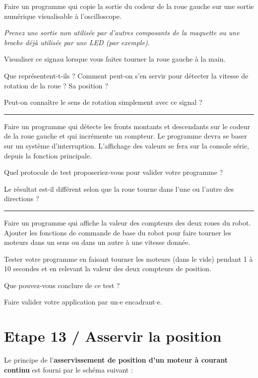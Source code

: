 \documentclass[a4paper,12pt,titlepage]{article} %
\begin{document}
\Manip Faire un programme qui copie la sortie du codeur de la roue gauche sur une sortie numérique visualisable à l'oscilloscope.

\textit{Prenez une sortie non utilisée par d'autres composants de la maquette ou une broche déjà utilisée par une LED (par exemple).}

\Manip Visualiser ce signau lorsque vous faites tourner la roue gauche à la main.

\Quest Que représentent-t-ils ? Comment peut-on s'en servir pour détecter la vitesse de rotation de la roue ? Sa position ? 

\Quest Peut-on connaître le sens de rotation simplement avec ce signal ?

\noindent \rule{\linewidth}{1pt}

\Manip Faire un programme qui détecte les fronts montants et descendants sur le codeur de la roue gauche et qui incrémente un compteur. Le programme devra se baser sur un système d'interruption. L'affichage des valeurs se fera sur la console série, depuis la fonction principale.

\Quest Quel protocole de test proposeriez-vous pour valider votre programme ?

\Quest Le résultat est-il différent selon que la roue tourne dans l'une ou l'autre des directions ?

\noindent \rule{\linewidth}{1pt}

\Manip Faire un programme qui affiche la valeur des compteurs des deux roues du robot. Ajouter les fonctions de commande de base du robot pour faire tourner les moteurs dans un sens ou dans un autre à une vitesse donnée.

\Manip Tester votre programme en faisant tourner les moteurs (dans le vide) pendant 1 à 10 secondes et en relevant la valeur des deux compteurs de position.

\Quest Que pouvez-vous conclure de ce test ?



\begin{mdframed}[style=sidebar,frametitle={}]
\large
Faire valider votre application par un$\cdot$e encadrant$\cdot$e.
\end{mdframed}


\newpage
\section{Etape 13 / Asservir la position}

Le principe de l'\textbf{asservissement de position d'un moteur à courant continu} est fourni par le schéma suivant :
\end{document}
